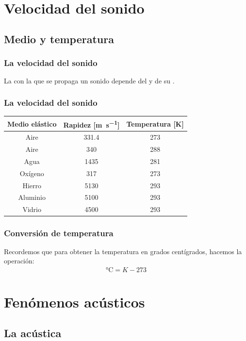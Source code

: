 \documentclass[14pt]{beamer}
\begin{document}
\section{Velocidad del sonido}
\subsection{Medio y temperatura}

\begin{frame}
\frametitle{La velocidad del sonido}
La  con la que se propaga un sonido depende del  y de su .
\end{frame}
\begin{frame}
\frametitle{La velocidad del sonido}
\begin{table}
\renewcommand{\arraystretch}{0.8}
\centering
\begin{tabular}{c | c | c }
Medio elástico & Rapidez [\unit{\meter\per\second}] & Temperatura [\unit{\kelvin}] \\ \hline
Aire & \num{331.4} & \num{273} \\ \hline
Aire & \num{340} & \num{288} \\ \hline
Agua & \num{1435} & \num{281} \\ \hline
Oxígeno & \num{317} & \num{273} \\ \hline
Hierro & \num{5130} & \num{293} \\ \hline
Aluminio & \num{5100} & \num{293} \\ \hline
Vidrio & \num{4500} & \num{293} \\ \hline
\end{tabular}
\end{table}
\end{frame}
\begin{frame}
\frametitle{Conversión de temperatura}
Recordemos que para obtener la temperatura en grados centígrados, hacemos la operación:
\pause
\begin{align*}
\unit{\degreeCelsius} = K - 273
\end{align*}
\end{frame}

\section{Fenómenos acústicos}
\subsection{La acústica}
\end{document}
